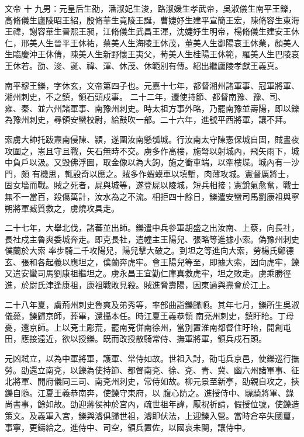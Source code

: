 
\begin{pinyinscope}

 文帝
 十
 九男：元皇后生劭，潘淑妃生浚，路淑媛生孝武帝，吳淑儀生南平王鑠，高脩儀生廬陵昭王紹，殷脩華生竟陵王誕，曹婕妤生建平宣簡王宏，陳脩容生東海
 王禕，謝容華生晉熙王昶，江脩儀生武昌王渾，沈婕妤生明帝，楊脩儀生建安王休仁，邢美人生晉平王休祐，蔡美人生海陵王休茂，董美人生鄱陽哀王休業，顏美人生臨慶沖王休倩，陳美人生新野懷王夷父，荀美人生桂陽王休範，羅美人生巴陵哀王休若。劭、浚、誕、禕、渾、休茂、休範別有傳。紹出繼廬陵孝獻王義真。



 南平穆王鑠，字休玄，文帝第四子也。元嘉十七年，都督湘州諸軍事、冠軍將軍、湘州刺史，不之鎮，領石頭戍事。
 二十二年，遷使持節、都督南豫、豫、司、雍、秦、並六州諸軍事、南豫州刺史。時太祖方事外略，乃罷南豫並壽陽，即以鑠為豫州刺史，尋領安蠻校尉，給鼓吹一部。二十六年，進號平西將軍，讓不拜。



 索虜大帥托跋燾南侵陳、潁，遂圍汝南懸瓠城。行汝南太守陳憲保城自固，賊晝夜攻圍之，憲且守且戰，矢石無時不交。虜多作高樓，施弩以射城內，飛矢雨下，城中負戶以汲。又毀佛浮圖，取金像以為大鉤，施之衝車端，以牽樓堞。城內有一沙門，頗
 有機思，輒設奇以應之。賊多作蝦蟆車以填塹，肉薄攻城。憲督厲將士，固女墻而戰。賊之死者，屍與城等，遂登屍以陵城，短兵相接；憲銳氣愈奮，戰士無不一當百，殺傷萬計，汝水為之不流。相拒四十餘日，鑠遣安蠻司馬劉康祖與寧朔將軍臧質救之，虜燒攻具走。



 二十七年，大舉北伐，諸蕃並出師。鑠遣中兵參軍胡盛之出汝南、上蔡，向長社，長社戍主魯爽委城奔走。即克長社，遣幢主王陽兒、張略等進據小索。偽豫州刺史僕蘭於大索
 率步騎二千攻陽兒，陽兒擊大破之。到坦之等進向大索，勞楊氏鄭德玄、張和各起義以應坦之，僕蘭奔虎牢。會王陽兒等至，即據大索，因向虎牢，鑠又遣安蠻司馬劉康祖繼坦之。虜永昌王宜勤仁庫真救虎牢，坦之敗走。虜乘勝徑進，於尉氏津逢康祖，康祖戰敗見殺。賊進脅壽陽，因東過與燾會於江上。



 二十八年夏，虜荊州刺史魯爽及弟秀等，率部曲詣鑠歸順。其年七月，鑠所生吳淑儀薨，鑠歸京師，葬畢，還攝本任。時江夏王義恭領
 南兗州刺史，鎮盱眙。丁母憂，還京師。上以兗土彫荒，罷南兗併南徐州，當別置淮南都督住盱眙，開創屯田，應接遠近，欲以授鑠。既而改授散騎常侍、撫軍將軍，領兵戍石頭。



 元凶弒立，以為中軍將軍，護軍、常侍如故。世祖入討，劭屯兵京邑，使鑠巡行撫勞。劭還立南兗，以鑠為使持節、都督南兗、徐、兗、青、冀、幽六州諸軍事、征北將軍、開府儀同三司、南兗州刺史，常侍如故。柳元景至新亭，劭親自攻之，挾鑠自隨。江夏王義恭南奔，使鑠守東府，以
 腹心防之。進授侍中、驃騎將軍、錄尚書事，餘如故。劭迎蔣侯神於宮內，疏世祖年諱，厭祝祈請，假授位號，使鑠造策文。及義軍入宮，鑠與濬俱歸世祖，濬即伏法，上迎鑠入營。當時倉卒失國璽，事寧，更鑄給之。進侍中、司空，領兵置佐，以國哀未闋，讓侍中。




\end{pinyinscope}
